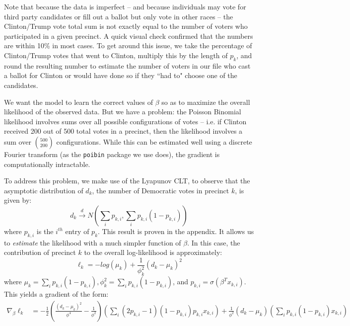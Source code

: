 \documentclass{article}
\begin{document}
Note that because the data is imperfect -- and because individuals may vote for third party candidates or fill out a ballot but only vote in other races -- the Clinton/Trump vote total sum is not exactly equal to the number of voters who participated in a given precinct. A quick visual check confirmed that the numbers are within 10\% in most cases. To get around this issue, we take the percentage of Clinton/Trump votes that went to Clinton, multiply this by the length of $p_k$, and round the resulting number to estimate the number of voters in our file who cast a ballot for Clinton or would have done so if they ``had to" choose one of the candidates. 

We want the model to learn the correct values of $\beta$ so as to maximize the overall likelihood of the observed data. But we have a problem: the Poisson Binomial likelihood involves sums over all possible configurations of votes -- i.e. if Clinton received 200 out of 500 total votes in a precinct, then the likelihood involves a sum over $500 \choose 200$ configurations. While this can be estimated well using a discrete Fourier transform (as the \texttt{poibin} package we use does), the gradient is computationally intractable. 

To address this problem, we make use of the Lyapunov CLT, to observe that the asymptotic distribution of $d_k$, the number of Democratic votes in precinct $k$, is given by: 
\[ d_k \stackrel{d} \longrightarrow N \left(\sum_{i} p_{k,i}, \sum_{i} p_{k, i}(1-p_{k, i}) \right) \] 
where $p_{k, i}$ is the $i^{th}$ entry of $p_k$. This result is proven in the appendix. It allows us to \emph{estimate} the likelihood with a much simpler function of $\beta$. In this case, the contribution of precinct $k$ to the overall log-likelihood is approximately: 
\[ \ell_k = -log \left( \mu_k\right) + \frac{1}{\phi_k^2} \left( d_k -\mu_k \right)^2  \] 
where $\mu_k =  \sum_{i} p_{k, i}(1-p_{k, i}), \phi_k^2 = \sum_{i} p_{k, i}(1-p_{k, i})$, and $p_{k, i} = \sigma(\beta^T x_{k, i})$. This yields a gradient of the form: 
\begin{align*}
\nabla_{\beta} \ell_k &=  -\frac{1}{2} \left(\frac{(d_k - \mu_k)^2}{\phi^4} - \frac{1}{\phi^2} \right) \left( \sum_{i} (2 p_{k, i} - 1)(1-p_{k, i})p_{k, i}x_{k, i} \right) + \frac{1}{\phi^2} (d_k - \mu_k) \left( \sum_i p_{k, i} (1 - p_{k, i}) x_{k, i} \right)
\end{align*}
\end{document}
